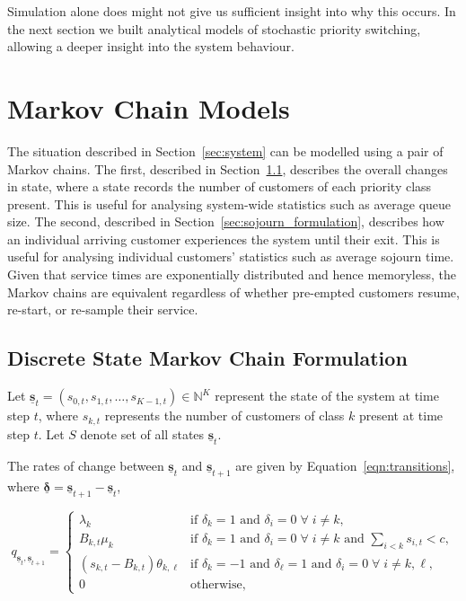 \documentclass{article}
\begin{document}
Simulation alone does might not give us sufficient insight into why this occurs.
In the next section we built analytical models of stochastic priority switching,
allowing a deeper insight into the system behaviour.


\section{Markov Chain Models}\label{sec:makovchains}
The situation described in Section~\ref{sec:system} can be modelled using a pair
of Markov chains.
The first, described in Section~\ref{sec:state_formulation}, describes the
overall changes in state, where a state records the number of customers of each
priority class present. This is useful for analysing system-wide statistics such
as average queue size.
The second, described in Section~\ref{sec:sojourn_formulation}, describes how an
individual arriving customer experiences the system until their exit. This is
useful for analysing individual customers' statistics such as average sojourn
time.
Given that service times are exponentially distributed and hence memoryless, the
Markov chains are equivalent regardless of whether pre-empted customers resume,
re-start, or re-sample their service.

\subsection{Discrete State Markov Chain Formulation}\label{sec:state_formulation}
Let
$\underline{\mathbf{s}}_t = (s_{0,t}, s_{1,t}, \dots, s_{K-1,t}) \in \mathbb{N}^K$
represent the state of the system at time step $t$, where $s_{k,t}$ represents
the number of customers of class $k$ present at time step $t$. Let $S$ denote
set of all states $\underline{\mathbf{s}}_t$. 

The rates of change between $\underline{\mathbf{s}}_t$ and
$\underline{\mathbf{s}}_{t+1}$ are given by Equation~\ref{eqn:transitions},
where $\underline{\mathbf{\delta}} = \underline{\mathbf{s}}_{t+1} - \underline{\mathbf{s}}_t$,

\begin{equation}\label{eqn:transitions}
q_{\underline{\mathbf{s}}_t, \underline{\mathbf{s}}_{t+1}} = 
\begin{cases}
\lambda_k & \text{if } \delta_k = 1 \text{ and } \delta_i = 0 \; \forall \; i \neq k, \\
B_{k,t} \mu_k & \text{if } \delta_k = 1 \text{ and } \delta_i = 0 \; \forall \; i \neq k \text{ and } \sum_{i < k} s_{i,t} < c, \\
(s_{k,t} - B_{k,t}) \theta_{k,\ell} & \text{if } \delta_{k} = -1 \text{ and } \delta_{\ell} = 1 \text{ and } \delta_i = 0 \; \forall \; i \neq k, \ell, \\
0 & \text{otherwise,}
\end{cases}
\end{equation}
\end{document}
